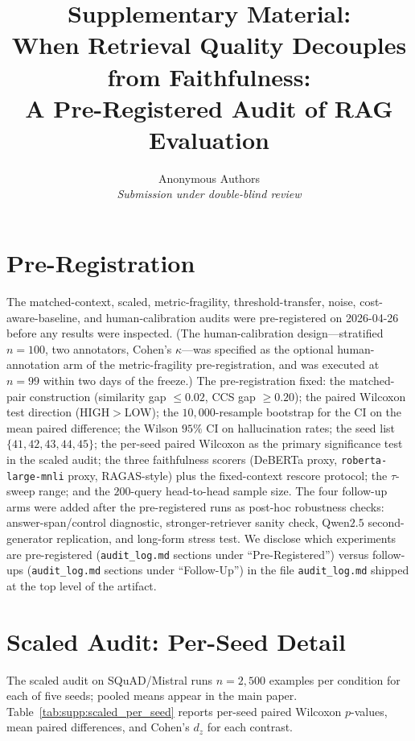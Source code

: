 \documentclass[11pt]{article}
\title{\Large\bfseries Supplementary Material:\\
When Retrieval Quality Decouples from Faithfulness:\\
A Pre-Registered Audit of RAG Evaluation}
\author{Anonymous Authors\\\textit{Submission under double-blind review}}
\date{}
\begin{document}
\maketitle

\tableofcontents

\section{Pre-Registration}
\label{supp:prereg}

The matched-context, scaled, metric-fragility, threshold-transfer,
noise, cost-aware-baseline, and human-calibration audits were
pre-registered on 2026-04-26 before any results were inspected. (The
human-calibration design---stratified $n=100$, two annotators, Cohen's
$\kappa$---was specified as the optional human-annotation arm of the
metric-fragility pre-registration, and was executed at $n=99$ within
two days of the freeze.) The pre-registration
fixed: the matched-pair construction (similarity gap $\leq 0.02$, CCS
gap $\geq 0.20$); the paired Wilcoxon test direction (HIGH$>$LOW); the
$10{,}000$-resample bootstrap for the CI on the mean paired difference;
the Wilson $95\%$ CI on hallucination rates; the seed list
$\{41, 42, 43, 44, 45\}$; the per-seed paired Wilcoxon as the primary
significance test in the scaled audit; the three faithfulness scorers
(DeBERTa proxy, \texttt{roberta-large-mnli} proxy, RAGAS-style) plus the
fixed-context rescore protocol; the $\tau$-sweep range; and the
$200$-query head-to-head sample size. The four follow-up arms were
added after the pre-registered runs as post-hoc robustness checks:
answer-span/control diagnostic, stronger-retriever sanity check,
Qwen$2.5$ second-generator replication, and long-form stress test. We disclose which experiments are
pre-registered (\texttt{audit\_log.md} sections under
``Pre-Registered'') versus follow-ups (\texttt{audit\_log.md} sections
under ``Follow-Up'') in the file
\texttt{audit\_log.md} shipped at the top level of the artifact.

\section{Scaled Audit: Per-Seed Detail}
\label{supp:scaled}

The scaled audit on SQuAD/Mistral runs $n=2{,}500$ examples per
condition for each of five seeds; pooled means appear in the main
paper. Table~\ref{tab:supp:scaled_per_seed} reports per-seed paired
Wilcoxon $p$-values, mean paired differences, and Cohen's $d_z$ for
each contrast.
\end{document}
